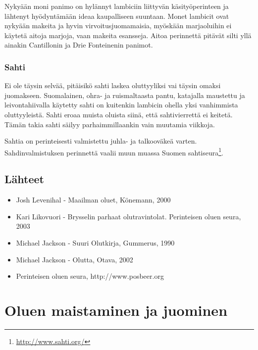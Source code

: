 \documentclass[a4paper,11pt]{report}
\begin{document}
Nykyään moni panimo on hylännyt lambiciin liittyvän käsityöperinteen ja lähtenyt hyödyntämään ideaa kaupalliseen suuntaan. Monet lambicit ovat nykyään makeita ja hyvin virvoitusjuomamaisia, myöskään marjaoluihin ei käytetä aitoja marjoja, vaan makeita esansseja. Aitoa perinnettä pitävät silti yllä ainakin Cantillonin ja Drie Fonteinenin panimot.

\subsection*{Sahti}

Ei ole täysin selvää, pitäisikö sahti laskea oluttyyliksi vai täysin omaksi juomakseen. Suomalainen, ohra- ja ruismaltaasta pantu, katajalla maustettu ja leivontahiivalla käytetty sahti on kuitenkin lambicin ohella yksi vanhimmista oluttyyleistä. Sahti eroaa muista oluista siinä, että sahtivierrettä ei keitetä. Tämän takia sahti säilyy parhaimmillaankin vain muutamia viikkoja.

Sahtia on perinteisesti valmistettu juhla- ja talkooväkeä varten. Sahdinvalmistuksen perinnettä vaalii muun muassa Suomen sahtiseura\footnote{\url{http://www.sahti.org/}}.

\section*{Lähteet}

\begin{itemize}
\item{Josh Levenihal - Maailman oluet, Könemann, 2000}
\item{Kari Likovuori - Brysselin parhaat olutravintolat. Perinteisen oluen seura, 2003}
\item{Michael Jackson - Suuri Olutkirja, Gummerus, 1990}
\item{Michael Jackson - Olutta, Otava, 2002}
\item{Perinteisen oluen seura, http://www.posbeer.org}
\end{itemize}

\chapter{Oluen maistaminen ja juominen}

\end{document}
